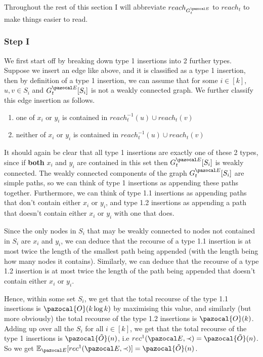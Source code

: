 \documentclass{report}
\begin{document}
Throughout the rest of this section I will abbreviate $reach_{G_{t}^{\pazocal E}}$ to $reach_t$ to make things easier to read.

\subsubsection{Step I}

We first start off by breaking down type 1 insertions into 2 further types. Suppose we insert an edge like above, and it is classified as a type 1 insertion, then by definition of a type 1 insertion, we can assume that for some $i \in [k]$, $u,v \in S_{i}$ and $G_{t}^{\pazocal E}[S_{i}]$ is not a weakly connected graph. We further classify this edge insertion as follows.

\begin{enumerate}[Type {1}.1]
    \item one of $x_{i}$ or $y_{i}$ is contained in $reach^{-1}_t(u) \cup reach_t(v)$
    \item neither of $x_{i}$ or $y_{i}$ is contained in $reach^{-1}_t(u) \cup reach_t(v)$
\end{enumerate}

It should again be clear that all type 1 insertions are exactly one of these 2 types, since if \textbf{both} $x_i$ and $y_i$ are contained in this set then $G_{t}^{\pazocal E}[S_{i}]$ is weakly connected. The weakly connected components of the graph $G_{t}^{\pazocal E}[S_{i}]$ are simple paths, so we can think of type 1 insertions as appending these paths together. Furthermore, we can think of type 1.1 insertions as appending paths that don't contain either $x_{i}$ or $y_{i}$, and type 1.2 insertions as appending a path that doesn't contain either $x_{i}$ or $y_{i}$ with one that does. 

Since the only nodes in $S_{i}$ that may be weakly connected to nodes not contained in $S_{i}$ are $x_{i}$ and $y_{i}$, we can deduce that the recourse of a type 1.1 insertion is at most twice the length of the smallest path being appended (with the length being how many nodes it contains). Similarly, we can deduce that the recourse of a type 1.2 insertion is at most twice the length of the path being appended that doesn't contain either $x_{i}$ or $y_{i}$.

Hence, within some set $S_{i}$, we get that the total recourse of the type 1.1 insertions is $\pazocal{O}(k \log k)$ by maximising this value, and similarly (but more obviously) the total recourse of the type 1.2 insertions is $\pazocal{O}(k)$. Adding up over all the $S_{i}$ for all $i \in [k]$, we get that the total recourse of the type 1 insertions is $\pazocal{\tilde{O}}(n)$, i.e $rec^1(\pazocal E, \prec)=\pazocal{\tilde{O}}(n)$. So we get $\mathbb E_{\pazocal E}[rec^1(\pazocal E, \prec)]=\pazocal{\tilde{O}}(n)$.
\end{document}
